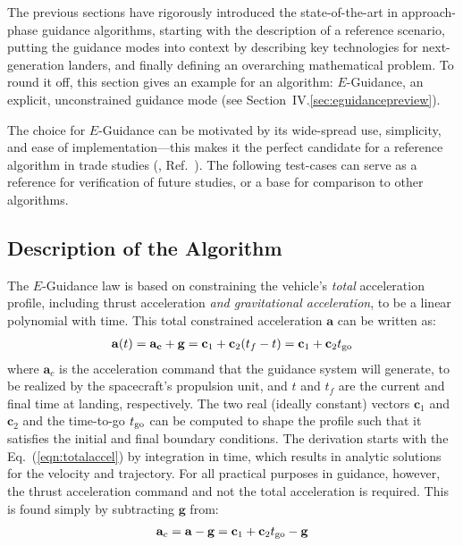 \documentclass[%
]{aiaa-tc}
\begin{document}
The previous sections have rigorously introduced the state-of-the-art in
approach-phase guidance algorithms, starting with the description of a reference
scenario, putting the guidance modes into context by describing key technologies
for next-generation landers, and finally defining an overarching mathematical
problem. To round it off, this section gives an example for an algorithm:
$E$-Guidance, an explicit, unconstrained guidance mode (see
Section~IV.\ref{sec:eguidancepreview}).

The choice for $E$-Guidance can be motivated by its wide-spread use, simplicity,
and ease of implementation---this makes it the perfect candidate for a reference
algorithm in trade studies (\eg, Ref.~). The
following test-cases can serve as a reference for verification of future studies,
or a base for comparison to other algorithms.



\subsection{Description of the Algorithm}

The $E$-Guidance law is based
on constraining the vehicle's \emph{total} acceleration profile, including thrust
acceleration \emph{and gravitational acceleration}, to be a linear polynomial with time.
This total constrained acceleration $\mathbf{a}$ can be written as:
\begin{align}
    \mathbf{a}(t)=\mathbf{a_c}+\mathbf{g} = \mathbf{c}_1 + \mathbf{c}_2(t_f-t) 
                 =\mathbf{c}_1 + \mathbf{c}_2  t_{\text{go}}
        \label{eqn:totalaccel}
\end{align}
where $\mathbf{a}_c$ is the acceleration command that the guidance system will
generate, to be realized by the spacecraft's propulsion unit, and $t$ and $t_f$
are the current and final time at landing, respectively. The two real (ideally
constant) vectors $\mathbf{c}_1$ and $\mathbf{c}_2$ and the time-to-go $t_{\text{go}}$
can be computed to shape the profile such that it satisfies the initial and
final boundary conditions. The derivation starts with the
Eq.~(\ref{eqn:totalaccel}) by integration in time, which results in analytic
solutions for the velocity and trajectory.  For all practical purposes in
guidance, however, the thrust acceleration command and not the total
acceleration is required. This is found simply by subtracting $\mathbf{g}$ from:
\begin{align}
    \mathbf{a}_c = \mathbf{a} - \mathbf{g} = \mathbf{c}_1 + \mathbf{c}_2 t_{\text{go}}- \mathbf{g}
    \label{eq:thrustcommand}
\end{align}
\end{document}

